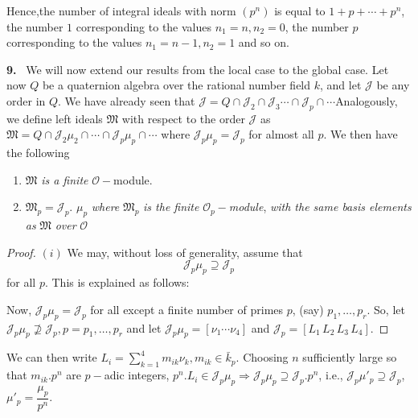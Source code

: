 Hence,\pageoriginale the number of integral ideals with norm $(p^n)$ is equal to $1
+ p + \cdots + p^n$, the number $1$ corresponding to the values $n_1 =
n, n_2 = 0$, the number $p$ corresponding to the values $n_1 = n-1,
n_2 = 1$ and so on. 

\textbf{9.}~ We will now extend our results from the local case to the global
case. Let now $Q$ be a quaternion algebra over the rational number field
$k$, and let $\mathcal{J}$ be any order in $Q$. We have already seen
that $\mathcal{J} = Q \cap \mathcal{J}_2 \cap \mathcal{J}_3 \cdots
\cap \mathcal{J}_p \cap \cdots$Analogously, we define left ideals
$\mathfrak{M}$ with respect to the order $\mathcal{J}$ as
$\mathfrak{M} = Q \cap \mathcal{J}_2 \mu_2 \cap \cdots \cap \mathcal{J}_p
\mu_p \cap \cdots$ where $\mathcal{J}_p \mu_p = \mathcal{J}_p$ for
almost all $p$. We then have the following  

\begin{theorem}\label{chap1:sec2:thm7} %
  \begin{enumerate}[\rm (i)]
  \item $\mathfrak{M}$ {\em is a finite} $\mathscr{O}-$module.
  \item $\mathfrak{M}_p = \mathcal{J}_p$. $\mu_p$ {\em where}
    $\mathfrak{M}_p$ {\em is the finite} $\mathscr{O}_p-${\em  module},
    {\em with the same basis elements as }$\mathfrak{M}$ {\em over}
    $\mathscr{O}$  
  \end{enumerate}
\end{theorem}

\begin{proof}
  $(i)$ We may, without loss of generality, assume that 
  \begin{equation}
    \mathcal{J}_p \mu_p \supseteq \mathcal{J}_p \tag{A}
  \end{equation}
  for all $p$. This is explained as follows:

  Now, $\mathcal{J}_p \mu_p = \mathcal{J}_p$ for all except a finite
  number of primes $p$, (say) $p_1, \ldots,  p_r$. So, let
  $\mathcal{J}_p \mu_p \nsupseteq \mathcal{J}_p, p = p_1, \ldots,  p_r$ and let
  $\mathcal{J}_p \mu_p = [\nu_1 \cdots \nu_4]$ and $\mathcal{J}_p =
  [L_1 \,L_2 \,L_3 \,L_4]$. 
\end{proof}

We can then write $L_i= \sum\limits^4_{k=1} m_{ik} \nu_k, m_{ik}
\in \bar{k}_p$. Choosing $n$ sufficiently large so that $m_{ik}. p^n$
are $p-$adic integers, $p^n. L_i \in \mathcal{J}_p \mu_p \Rightarrow
\mathcal{J}_p \mu_p \supseteq \mathcal{J}_p. p^n$, i.e., $\mathcal{J}_p
\mu'_p \supseteq \mathcal{J}_p$, $\mu'_p = \dfrac{\mu_p}{p^n}$.  

